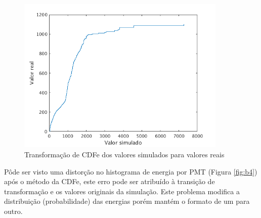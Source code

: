 \begin{figure}[H]
	\centering
	\includegraphics[width=10cm]{textuais/simulacao/figuras/cdfe.png}
	\caption{Transformação de CDFe dos valores simulados para valores reais }
	\label{fig:transf}
\end{figure}


Pôde ser visto uma distorção no histograma de energia por PMT (Figura \ref{fig:b4}) após o método da CDFe, este erro pode ser atribuído à transição de transformação e os valores originais da simulação. Este problema modifica a distribuição (probabilidade) das energias porém mantém o formato de um para outro.